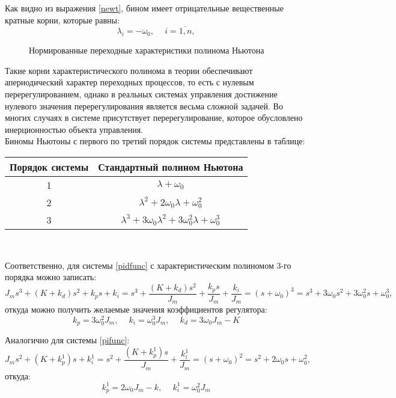 Как видно из выражения \eqref{newt}, бином имеет отрицательные вещественные кратные корни, которые равны:
\begin{equation}
	\lambda_i=-\omega_0, \phantom{-}i=\overline{1,n},
\end{equation}

\begin{figure}[h]
	\noindent{}
	\caption{Нормированные переходные характеристики полинома Ньютона}
	\label{newgraph}
\end{figure}

Такие корни характеристического полинома в теории обеспечивают апериодический характер переходных процессов, то есть с нулевым перерегулированием, однако в реальных системах управления достижение нулевого значения перерегулирования является весьма сложной задачей. Во многих случаях в системе присутствует перерегулирование, которое обусловлено инерционностью объекта управления.\\

Биномы Ньютоны с первого по третий порядок системы представлены в таблице:
\begin{center}
\begin{tabular}{ |c|c| } 
 \hline
 Порядок системы &  Стандартный полином Ньютона \\ 
 \hline
 1 & $\lambda+\omega_0$ \\ 
 \hline
 2 & $\lambda^2+2\omega_0\lambda+\omega_0^2$ \\ 
 \hline
 3 & $\lambda^3+3\omega_0\lambda^2+3\omega_0^2\lambda+\omega_0^3$ \\ 
 \hline
\end{tabular}\\
\end{center}

Соответственно, для системы \eqref{pidfunc} с характеристическим полиномом 3-го порядка можно записать:
\begin{equation}
	J_ms^3+(K+k_d)s^2+k_ps+k_i = s^3+\frac{(K+k_d)s^2}{J_m}+\frac{k_ps}{J_m} +\frac{k_i}{J_m} =(s+\omega_0)^3= s^3+3\omega_0s^2+3\omega_0^2s+\omega_0^3,
\end{equation}
откуда можно получить желаемые значения коэффициентов регулятора:
\begin{equation}
	k_p = 3\omega_0^2J_m, \phantom{- }k_i = \omega_0^3J_m, \phantom{- } k_d=3\omega_0J_m - K
\end{equation}

Аналогично для системы \eqref{pifunc}:
\begin{equation}
	J_ms^2+(K+k_p^1)s+k_i^1 = s^2+\frac{(K+k_p^1)s}{J_m}+\frac{k_i^1}{J_m} =(s+\omega_0)^2= s^2+2\omega_0s+\omega_0^2,
\end{equation}
откуда:
\begin{equation}
	k_p^1 = 2\omega_0J_m-k, \phantom{- }k_i^1 = \omega_0^2J_m
\end{equation}

